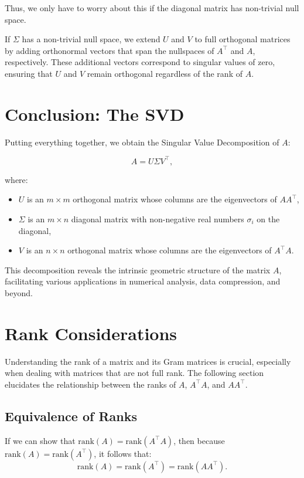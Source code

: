 \documentclass{article}
\begin{document}
Thus, we only have to worry about this if the diagonal matrix has non-trivial null space.

If \( \Sigma \) has a non-trivial null space, we extend \( U \) and \( V \) to full orthogonal matrices by adding orthonormal vectors that span the nullspaces of \( A^\top \) and \( A \), respectively. These additional vectors correspond to singular values of zero, ensuring that \( U \) and \( V \) remain orthogonal regardless of the rank of \( A \).


\section{Conclusion: The SVD}

Putting everything together, we obtain the Singular Value Decomposition of \( A \):

\[
A = U \Sigma V^\top,
\]

where:
\begin{itemize}
    \item \( U \) is an \( m \times m \) orthogonal matrix whose columns are the eigenvectors of \( A A^\top \),
    \item \( \Sigma \) is an \( m \times n \) diagonal matrix with non-negative real numbers \( \sigma_i \) on the diagonal,
    \item \( V \) is an \( n \times n \) orthogonal matrix whose columns are the eigenvectors of \( A^\top A \).
\end{itemize}

This decomposition reveals the intrinsic geometric structure of the matrix \( A \), facilitating various applications in numerical analysis, data compression, and beyond.

\section{Rank Considerations}

Understanding the rank of a matrix and its Gram matrices is crucial, especially when dealing with matrices that are not full rank. The following section elucidates the relationship between the ranks of \( A \), \( A^\top A \), and \( A A^\top \).

\subsection{Equivalence of Ranks}

If we can show that \( \text{rank}(A) = \text{rank}(A^\top A) \), then because \( \text{rank}(A) = \text{rank}(A^\top) \), it follows that:
\[
\text{rank}(A) = \text{rank}(A^\top) = \text{rank}(A A^\top).
\]
\end{document}
